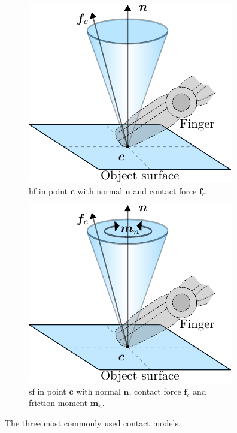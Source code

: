 \begin{figure}[h]
\begin{subfigure}[b]{0.3\textwidth}
		\includegraphics[width=\textwidth]{chapters/modeling/fig/hf-crop.pdf}
		\caption{\gls{hf} in point $\bm{c}$ with normal $\bm{n}$ and contact force $\bm{f}_c$.}
		\label{fig:hf}
	\end{subfigure}
	\hfill
	\begin{subfigure}[b]{0.3\textwidth}
		\centering
		\includegraphics[width=\textwidth]{chapters/modeling/fig/sf-crop.pdf}
		\caption{\gls{sf} in point $\bm{c}$ with normal $\bm{n}$, contact force $\bm{f}_c$ and friction moment $\bm{m}_n$.}
		\label{fig:sf}
	\end{subfigure}
	   \caption{The three most commonly used contact models.}
	   \label{fig:contact-models}
\end{figure}

